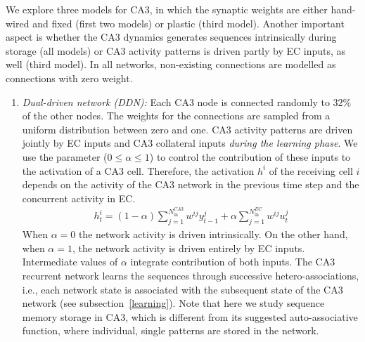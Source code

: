 \documentclass[utf8]{frontiersSCNS} %
\begin{document}
We explore three models for CA3, in which the synaptic weights are either hand-wired and fixed (first two models) or plastic (third model). 
%
Another important aspect is whether the CA3 dynamics generates sequences intrinsically during storage (all models) or CA3 activity patterns is driven partly by EC inputs, as well (third model). 
%
In all networks, non-existing connections are modelled as connections with zero weight.
%
\begin{enumerate}
\item \textit{Dual-driven network (DDN):} Each CA3 node is connected randomly to $32\%$ of the other nodes. The weights for the connections are sampled from a uniform distribution between zero and one.
%
CA3 activity patterns are driven jointly by EC inputs and CA3 collateral inputs \textit{during the learning phase}.
%
We use the parameter ($0 \leq \alpha \leq 1$) to control the contribution of these inputs to the activation of a CA3 cell. 
%
Therefore, the activation $h^i$ of the receiving cell $i$ depends on the activity of the CA3 network in the previous time step and the concurrent activity in EC.
%
\begin{align}
\label{activationDDN}
h^{i}_{t} = (1 - \alpha) \sum_{j = 1}^{N^{CA3}_\mathrm{in}} {{w^{ij} y^{j}_{t-1}}} + \alpha \sum_{j = 1}^{N^{EC}_\mathrm{in}} {{w^{ij} u^{j}_{t}}} 
\end{align}
%
When $\alpha = 0$ the network activity is driven intrinsically. On the other hand, when $\alpha = 1$, the network activity is driven entirely by EC inputs. Intermediate values of $\alpha$ integrate contribution of both inputs.
%
The CA3 recurrent network learns the sequences through successive hetero-associations, i.e.,  each network state is associated with the subsequent state of the CA3 network (see subsection~\ref{learning}).
%
Note that here we study sequence memory storage in CA3, which is different from its suggested auto-associative function, where individual, single patterns are stored in the network.


\end{enumerate}
\end{document}
